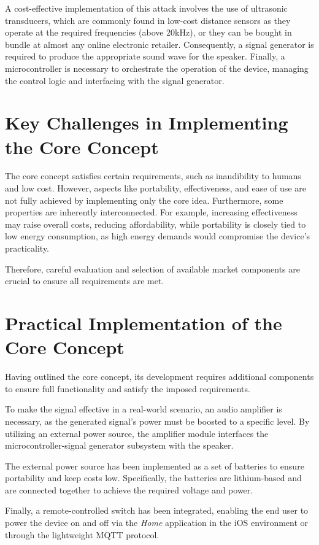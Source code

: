 A cost-effective implementation of this attack involves the use of ultrasonic transducers, which are commonly found in low-cost distance sensors as they operate at the required frequencies (above 20kHz), or they can be bought in bundle at almost any online electronic retailer.
Consequently, a signal generator is required to produce the appropriate sound wave for the speaker. 
Finally, a microcontroller is necessary to orchestrate the operation of the device, managing the control logic and interfacing with the signal generator. 

\section{Key Challenges in Implementing the Core Concept}
The core concept satisfies certain requirements, such as inaudibility to humans and low cost. 
However, aspects like portability, effectiveness, and ease of use are not fully achieved by implementing only the core idea. 
Furthermore, some properties are inherently interconnected. 
For example, increasing effectiveness may raise overall costs, reducing affordability, while portability is closely tied to low energy consumption, as high energy demands would compromise the device's practicality.

Therefore, careful evaluation and selection of available market components are crucial to ensure all requirements are met.

\section{Practical Implementation of the Core Concept}
Having outlined the core concept, its development requires additional components to ensure full functionality and satisfy the imposed requirements. 

To make the signal effective in a real-world scenario, an audio amplifier is necessary, as the generated signal's power must be boosted to a specific level.
By utilizing an external power source, the amplifier module interfaces the microcontroller-signal generator subsystem with the speaker.

The external power source has been implemented as a set of batteries to ensure portability and keep costs low.
Specifically, the batteries are lithium-based and are connected together to achieve the required voltage and power.

Finally, a remote-controlled switch has been integrated, enabling the end user to power the device on and off via the \textit{Home} application in the iOS environment or through the lightweight MQTT protocol.

